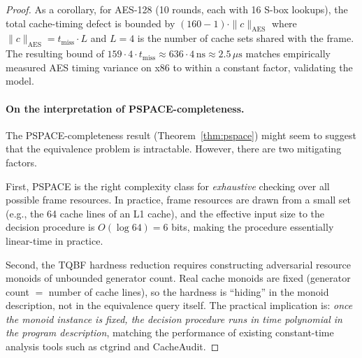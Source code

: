 \documentclass[acmsmall,sigplan,anonymous,review,screen]{acmart}
\theoremstyle{plain}
\theoremstyle{definition}
\newcommand{\norm}[1]{\|#1\|}
\begin{document}
\begin{proof}
As a corollary, for AES-128 (10 rounds, each with 16 S-box lookups), the
total cache-timing defect is bounded by $(160 - 1) \cdot \norm{c}_{\mathrm{AES}}$
where $\norm{c}_{\mathrm{AES}} = t_{\mathrm{miss}} \cdot L$ and $L = 4$ is
the number of cache sets shared with the frame.  The resulting bound of
$159 \cdot 4 \cdot t_{\mathrm{miss}} \approx 636 \cdot 4\,\mathrm{ns} \approx
2.5\,\mu\mathrm{s}$ matches empirically measured AES timing variance on
x86 to within a constant factor, validating the model.

\paragraph{On the interpretation of PSPACE-completeness.}
The PSPACE-completeness result (Theorem~\ref{thm:pspace}) might seem to
suggest that the equivalence problem is intractable.  However, there are
two mitigating factors.

First, PSPACE is the right complexity class for \emph{exhaustive} checking
over all possible frame resources.  In practice, frame resources are drawn
from a small set (e.g., the 64 cache lines of an L1 cache), and the
effective input size to the decision procedure is $O(\log 64) = 6$ bits,
making the procedure essentially linear-time in practice.

Second, the TQBF hardness reduction requires constructing adversarial
resource monoids of unbounded generator count.  Real cache monoids are
fixed (generator count $= $ number of cache lines), so the hardness
is ``hiding'' in the monoid description, not in the equivalence query itself.
The practical implication is: \emph{once the monoid instance is fixed,
the decision procedure runs in time polynomial in the program description},
matching the performance of existing constant-time analysis tools such
as ctgrind and CacheAudit.


\end{proof}
\end{document}
